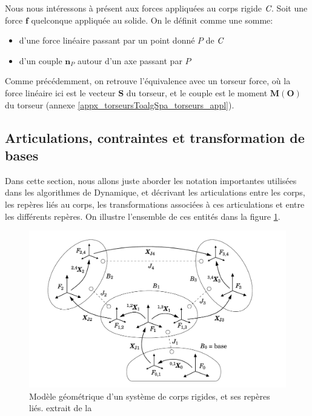 \documentclass{report}
\begin{document}
Nous nous intéressons à présent aux forces appliquées au corps rigide $\emph{C}$. Soit une force $\textbf{f}$ quelconque appliquée au solide. On le définit comme une somme:
\begin{itemize}
\item d'une force linéaire passant par un point donné $P$ de $\emph{C}$
\item d'un couple $\textbf{n}_{P}$ autour d'un axe passant par $P$
\end{itemize}

Comme précédemment, on retrouve l'équivalence avec un torseur force, où la force linéaire ici est le vecteur $\mathbf{S}$ du torseur, et le couple est le moment $\mathbf{M(O)}$ du torseur (annexe \ref{appx_torseursToalgSpa_torseurs_appl}).


\subsection{Articulations, contraintes et transformation de bases} \label{ch_algSpa_transformations}

Dans cette section, nous allons juste aborder les notation importantes utilisées dans les algorithmes de Dynamique, et décrivant les articulations entre les corps, les repères liés au corps, les transformations associées à ces articulations et entre les différents repères. On illustre l'ensemble de ces entités dans la figure \ref{fig_corpsEtReperes}.

\begin{figure}[H]
  \centering
  \includegraphics[width=\textwidth]{figs/modeleGeoEtArticulations.png}
  \caption{Modèle géométrique d'un système de corps rigides, et ses repères liés. extrait de la \cite[section 4.2, figure 4.7]{bib_featherstone}}
  \label{fig_corpsEtReperes}
\end{figure}
\end{document}
